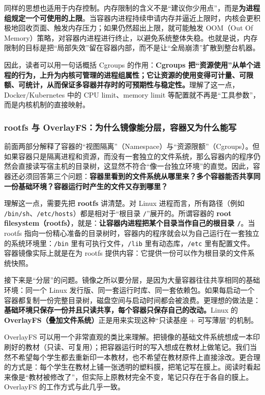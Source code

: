 同样的思想也适用于内存控制。内存限制的含义不是“建议你少用点”，而是\textbf{为进程组规定一个可使用的上限}。当容器内进程持续申请内存并逼近上限时，内核会更积极地回收页面、触发内存压力；如果仍然超出上限，就可能触发 OOM（Out Of Memory）策略，对容器内进程进行终止，以避免系统整体失稳。也就是说，内存限制的目标是把“局部失效”留在容器内部，而不是让“全局崩溃”扩散到整台机器。

因此，读者可以用一句话概括 Cgroups 的作用：\textbf{Cgroups 把“资源使用”从单个进程的行为，上升为内核可管理的进程组属性；它让资源的使用变得可计量、可限额、可统计，从而保证多容器并存时的可预期性与稳定性。}理解了这一点，Docker/Kubernetes 中的 CPU limit、memory limit 等配置就不再是“工具参数”，而是内核机制的直接映射。


\subsubsection{rootfs 与 OverlayFS：为什么镜像能分层，容器又为什么能写}

前面两部分解释了容器的“视图隔离”（Namespace）与“资源限额”（Cgroups）。但如果容器只是隔离进程和资源，而没有一套独立的文件系统，那么容器内的程序仍然会直接读写宿主机的目录树，这显然不符合“像一台独立环境”的直觉。因此，容器还必须回答第三个问题：\textbf{容器里看到的文件系统从哪里来？多个容器能否共享同一份基础环境？容器运行时产生的文件又存到哪里？}

理解这一点，需要先把 \textbf{rootfs} 讲清楚。对 Linux 进程而言，所有路径（例如 \texttt{/bin/sh}、\texttt{/etc/hosts}）都是相对于“根目录 \texttt{/}”展开的。所谓容器的 \textbf{root filesystem（rootfs）}，就是：\textbf{让容器内进程把某个目录当作自己的根目录 \texttt{/}}。当 rootfs 指向一份精心准备的目录树时，容器内的程序就会以为自己运行在一套独立的系统环境里：\texttt{/bin} 里有可执行文件，\texttt{/lib} 里有动态库，\texttt{/etc} 里有配置文件。容器镜像实际上就是在为 rootfs 提供内容：它提供一份可以作为根目录的文件系统快照。

接下来是“分层”的问题。镜像之所以要分层，是因为大量容器往往共享相同的基础环境：同一个 Linux 发行版、同一套运行时库、同一套依赖包。如果每启动一个容器都复制一份完整目录树，磁盘空间与启动时间都会被浪费。更理想的做法是：\textbf{基础环境只保存一份并且只读共享，每个容器只保存自己的改动。}Linux 的 \textbf{OverlayFS（叠加文件系统）}正是用来实现这种“只读基座 + 可写薄层”的机制。

OverlayFS 可以用一个非常直观的类比来理解。把镜像的基础文件系统想成一本印刷好的教材（只读、可复用）；把容器运行时的写入想成在教材上做笔记。我们当然不希望每个学生都去重新印一本教材，也不希望在教材原件上直接涂改。更合理的方式是：每个学生在教材上铺一张透明的塑料膜，把笔记写在膜上。阅读时看起来像是“教材被修改了”，但实际上原教材完全不变，笔记只存在于各自的膜上。OverlayFS 的工作方式与此几乎一致。

